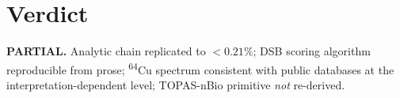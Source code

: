 \documentclass[11pt]{article}
\begin{document}
\section{Verdict}
\textbf{PARTIAL.}  Analytic chain replicated to $<0.21\%$; DSB scoring
algorithm reproducible from prose; \textsuperscript{64}Cu spectrum
consistent with public databases at the interpretation-dependent level;
TOPAS-nBio primitive \emph{not} re-derived.


\end{document}
